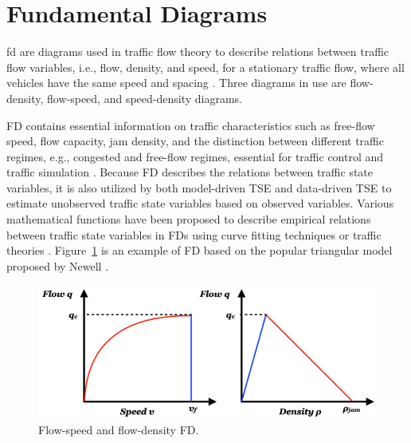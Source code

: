 \documentclass[english]{kththesis}
\begin{document}
\section{Fundamental Diagrams}
\label{sec:fd}
\gls{fd} are diagrams used in traffic flow theory to describe relations between traffic flow variables, i.e., flow, density, and speed, for a stationary traffic flow, where all vehicles have the same speed and spacing \cite{sumalee_future_ITS, Hoogendoorn_traffic_flow_theory_tu-delft}. Three diagrams in use are flow-density, flow-speed, and speed-density diagrams.

FD contains essential information on traffic characteristics such as free-flow speed, flow capacity, jam density, and the distinction between different traffic regimes, e.g., congested and free-flow regimes, essential for traffic control and traffic simulation \cite{dervisoglu_auto-calibrate_fd, seo_fd_probe}. Because FD describes the relations between traffic state variables, it is also utilized by both model-driven TSE \cite{seo_fd_probe} and data-driven TSE \cite{anuar_flow_probe} to estimate unobserved traffic state variables based on observed variables. Various mathematical functions have been proposed to describe empirical relations between traffic state variables in FDs using curve fitting techniques or traffic theories \cite{seo_tse, Hoogendoorn_traffic_flow_theory_tu-delft}. Figure~\ref{fig:triangular_fd} is an example of FD based on the popular triangular model proposed by Newell \cite{newell_triangular_fd}. 

\begin{figure}[!ht]
    \centering
    \includegraphics[width=\textwidth]{triangular_fd.png}
    \caption{Flow-speed and flow-density FD.}
    \label{fig:triangular_fd}
\end{figure}
\end{document}
